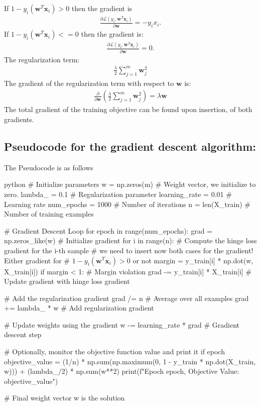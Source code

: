 \documentclass{article}
\begin{document}
If $1-y_i\left(\boldsymbol{w}^T \boldsymbol{x}_i\right) > 0$ then the gradient is 
\begin{align}
    \frac{\partial \mathscr{L}\left(y_i, \boldsymbol{w}^T \boldsymbol{x}_i\right)}{\partial \boldsymbol{w}} = - y_i x_i.
\end{align}
If $1-y_i\left(\boldsymbol{w}^T \boldsymbol{x}_i\right) <= 0$ then the gradient is:
\begin{align}
    \frac{\partial \mathscr{L}\left(y_i, \boldsymbol{w}^T \boldsymbol{x}_i\right)}{\partial \boldsymbol{w}} = 0.
\end{align}
The regularization term:
\begin{align}
    \frac{\lambda}{2} \sum_{j=1}^m \boldsymbol{w}_j^2
\end{align}
The gradient of the regularization term with respect to $\boldsymbol{w}$ is:
\begin{align}
  \frac{\partial}{\partial \boldsymbol{w}}\left(\frac{\lambda}{2} \sum_{j=1}^m \boldsymbol{w}_j^2\right)=\lambda \boldsymbol{w}  
\end{align}
The total gradient of the training objective can be found upon insertion, of both gradients.
\subsection{Pseudocode for the gradient descent algorithm:}
The Pseudocode is as follows
\begin{mintedbox}{python}
# Initialize parameters
w = np.zeros(m)  # Weight vector, we initialize to zero.
lambda_ = 0.1     # Regularization parameter
learning_rate = 0.01  # Learning rate
num_epochs = 1000  # Number of iterations
n = len(X_train)  # Number of training examples

# Gradient Descent Loop
for epoch in range(num_epochs):
    grad = np.zeros_like(w)  # Initialize gradient
    for i in range(n):
        # Compute the hinge loss gradient for the i-th sample
        # we need to insert now both cases for the gradient! Either gradient for 
        # $1-y_i\left(\boldsymbol{w}^T \boldsymbol{x}_i\right) > 0$ or not
        margin = y_train[i] * np.dot(w, X_train[i])
        if margin < 1:  # Margin violation
            grad -= y_train[i] * X_train[i]  # Update gradient with hinge loss gradient

    # Add the regularization gradient
    grad /= n  # Average over all examples
    grad += lambda_ * w  # Add regularization gradient

    # Update weights using the gradient
    w -= learning_rate * grad  # Gradient descent step

    # Optionally, monitor the objective function value and print it
    if epoch %
        objective_value = (1/n) * np.sum(np.maximum(0, 1 - y_train * np.dot(X_train, w))) + (lambda_/2) * np.sum(w**2)
        print(f"Epoch {epoch}, Objective Value: {objective_value}")

# Final weight vector w is the solution
\end{mintedbox}
\end{document}
